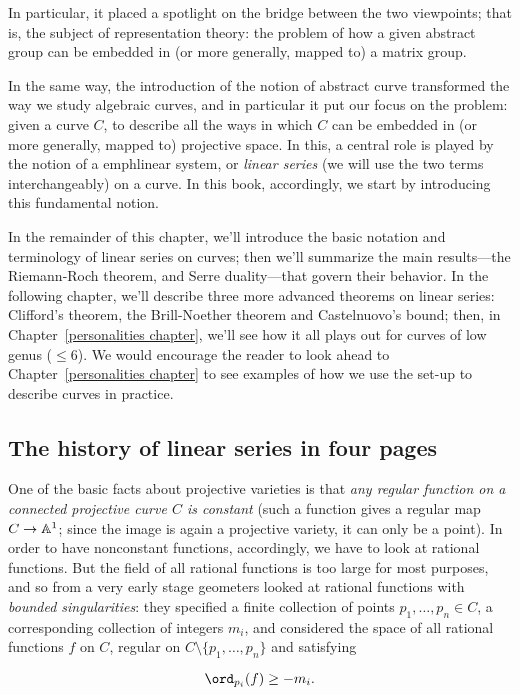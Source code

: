 In particular, it placed a spotlight on the bridge between the two viewpoints; that is, the subject of representation theory: the problem of how a given abstract group can be embedded in (or more generally, mapped to) a matrix group.

In the same way, the introduction of the notion of abstract curve transformed the way we study algebraic curves, and in particular it put our focus on the problem: given a curve $C$, to describe all the ways in which $C$ can be embedded in (or more generally, mapped to) projective space. In this, a central role is played by the notion of a emph{linear system}, or \emph{linear series} (we will use the two terms interchangeably) on a curve. In this book, accordingly, we start by introducing this fundamental notion.

In the remainder of this chapter, we'll introduce the basic notation and terminology of linear series on curves; then we'll summarize the main results---the Riemann-Roch theorem, and Serre duality---that govern their behavior. In the following chapter, we'll describe three more advanced theorems on linear series: Clifford's theorem, the Brill-Noether theorem and Castelnuovo's bound; then, in Chapter~\ref{personalities chapter}, we'll see how it all plays out for curves of low genus ($\leq 6$). We would encourage the reader to look ahead to Chapter~\ref{personalities chapter} to see examples of how we use the set-up to describe curves in practice.

\subsection{The history of linear series in four pages}

One of the basic facts about projective varieties is that \emph{any regular function on a connected projective curve $C$ is constant} (such a function gives a regular map $C \to \AA^1$; since the image is again a projective variety, it can only be a point).  In order to have nonconstant functions, accordingly, we have to look at rational functions. But the field of all rational functions is too large for most purposes, and so from a very early stage geometers looked at rational functions with \emph{bounded singularities}: they specified a finite collection of points $p_1,\dots,p_n \in C$, a corresponding collection of integers $m_i$, and considered the space of all rational functions $f$ on $C$, regular on $C \setminus \{p_1,\dots,p_n\}$  and satisfying

\begin{equation}\label{divisor condition}
\ord_{p_i}(f) \geq -m_i.
\end{equation}

